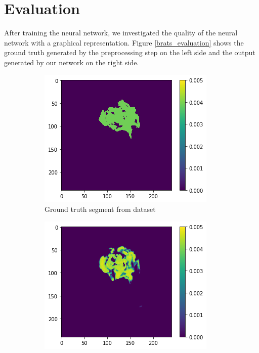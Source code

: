 \section{Evaluation}

After training the neural network, we investigated the quality of the neural network with a graphical representation. Figure \ref{brats_evaluation}
shows the ground truth generated by the preprocessing step on the left side and the output generated by our network on the right side.

\begin{figure}[H]
    \centering
    \begin{subfigure}[t]{.5\textwidth}
        \centering
        \includegraphics[width=\linewidth]{chapters/04_segmentation/images/evaluate1.png}
        \caption{Ground truth segment from dataset}
    \end{subfigure}%
    \begin{subfigure}[t]{.5\textwidth}
        \centering
        \includegraphics[width=\linewidth]{chapters/04_segmentation/images/evaluate2.png}

\end{subfigure}
\end{figure}
